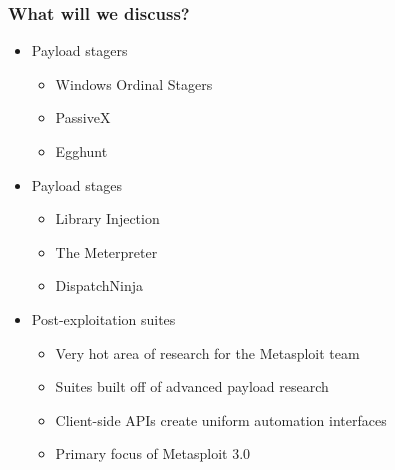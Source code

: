\documentclass{beamer}
\newenvironment{sitemize}{\vspace{1mm}\begin{itemize}\itemsep 4pt\small}{\end{itemize}}
\begin{document}
\begin{frame}[t]
    \frametitle{What will we discuss?}

    \begin{sitemize}
        \item Payload stagers
        \begin{sitemize}
            \item Windows Ordinal Stagers
            \item PassiveX
            \item Egghunt
        \end{sitemize}

        \pause
        \item Payload stages
        \begin{sitemize}
            \item Library Injection
            \item The Meterpreter
            \item DispatchNinja
        \end{sitemize}

        \pause
        \item Post-exploitation suites
        \begin{sitemize}
            \item Very hot area of research for the Metasploit team
            \item Suites built off of advanced payload research
            \item Client-side APIs create uniform automation interfaces
            \item Primary focus of Metasploit 3.0
        \end{sitemize}
    \end{sitemize}
\end{frame}
\end{document}
